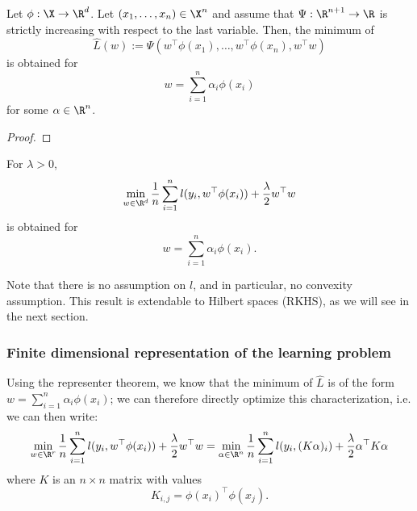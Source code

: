 \documentclass[toc]{../cs-classes/cs-classes}
\begin{document}
\begin{theorem}
    Let $\phi:\X\to\R^d$. Let $(x_1, \dots, x_n)\in\X^n$ and assume that $\Psi:\R^{n+1}\to\R$ is strictly increasing with respect to the last variable. Then, the minimum of
    \begin{equation*}
        \hat{L}(w) := \Psi(w^\top\phi(x_1), \dots, w^\top\phi(x_n), w^\top w)
    \end{equation*}
    is obtained for
    \begin{equation*}
        w=\sum_{i=1}^n \alpha_i \phi(x_i)
    \end{equation*} for some $\alpha\in\R^n$.
\end{theorem}

\begin{proof}
\end{proof}

\begin{corollary}
    For $\lambda>0$, 
    \begin{equation*}
        \min_{w\in\R^d} \frac{1}{n} \sum_{i=1}^n l(y_i, w^\top\phi(x_i)) + \frac{\lambda}{2} w^\top w
    \end{equation*}
    is obtained for
    \begin{equation*}
        w = \sum_{i=1}^n \alpha_i\phi(x_i).
    \end{equation*}
\end{corollary}

Note that there is no assumption on $l$, and in particular, no convexity assumption. This result is extendable to Hilbert spaces (RKHS), as we will see in the next section.

\subsubsection{Finite dimensional representation of the learning problem}
Using the representer theorem, we know that the minimum of $\hat{L}$ is of the form $w=\sum_{i=1}^n \alpha_i\phi(x_i)$; we can therefore directly optimize this characterization, i.e. we can then write:
\begin{equation*}
    \min_{w\in\R^r} \frac{1}{n} \sum_{i=1}^n l(y_i, w^\top\phi(x_i)) + \frac{\lambda}{2} w^\top w = \min_{\alpha\in\R^n} \frac{1}{n}\sum_{i=1}^n l(y_i, (K\alpha)_i) + \frac{\lambda}{2}\alpha^\top K\alpha
\end{equation*}
where $K$ is an $n\times n$ matrix with values
\begin{equation*}
    K_{i, j} = \phi(x_i)^\top \phi(x_j).
\end{equation*}
\end{document}
